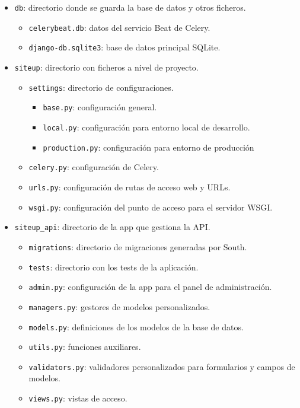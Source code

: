 \begin{itemize}
\item \texttt{db}: directorio donde se guarda la base de datos y otros ficheros.
  \begin{itemize}
  \item \texttt{celerybeat.db}: datos del servicio Beat de Celery.
  \item \texttt{django-db.sqlite3}: base de datos principal SQLite.
  \end{itemize}
\item \texttt{siteup}: directorio con ficheros a nivel de proyecto.
  \begin{itemize}
  \item \texttt{settings}: directorio de configuraciones.
    \begin{itemize}
    \item \texttt{base.py}: configuración general.
    \item \texttt{local.py}: configuración para entorno local de desarrollo.
    \item \texttt{production.py}: configuración para entorno de producción
    \end{itemize}
  \item \texttt{celery.py}: configuración de Celery.
  \item \texttt{urls.py}: configuración de rutas de acceso web y URLs.
  \item \texttt{wsgi.py}: configuración del punto de acceso para el servidor WSGI.
  \end{itemize}
\item \texttt{siteup\_api}: directorio de la app que gestiona la API.
  \begin{itemize}
  \item \texttt{migrations}: directorio de migraciones generadas por South.
  \item \texttt{tests}: directorio con los tests de la aplicación.
  \item \texttt{admin.py}: configuración de la app para el panel de administración.
  \item \texttt{managers.py}: gestores de modelos personalizados.
  \item \texttt{models.py}: definiciones de los modelos de la base de datos.
  \item \texttt{utils.py}: funciones auxiliares.
  \item \texttt{validators.py}: validadores personalizados para formularios y
    campos de modelos.
  \item \texttt{views.py}: vistas de acceso.
  \end{itemize}


\end{itemize}
